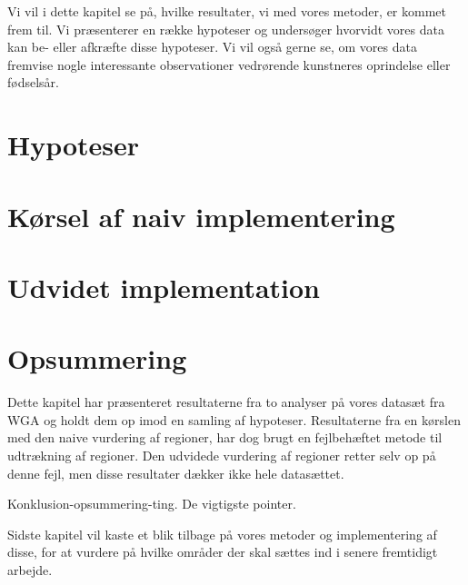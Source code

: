 {
{\sffamily Vi vil i dette kapitel se på, hvilke resultater, vi med vores
metoder, er kommet frem til. Vi præsenterer en række hypoteser og
undersøger hvorvidt vores data kan be- eller afkræfte disse hypoteser.
Vi vil også gerne se, om vores data fremvise nogle interessante
observationer vedrørende kunstneres oprindelse eller fødselsår.
}

\section{Hypoteser}


\section{Kørsel af naiv implementering\label{section_naiv_koersel}}

\clearpage



\section{Udvidet implementation\label{section_udvidet_koersel}}


\section*{Opsummering}
Dette kapitel har præsenteret resultaterne fra to analyser på vores
datasæt fra WGA og holdt dem op imod en samling af hypoteser.
Resultaterne fra en kørslen med den naive vurdering af regioner, har dog
brugt en fejlbehæftet metode til udtrækning af regioner.  Den udvidede
vurdering af regioner retter selv op på denne fejl, men disse resultater
dækker ikke hele datasættet.

Konklusion-opsummering-ting. De vigtigste pointer.

Sidste kapitel vil kaste et blik tilbage på vores metoder og
implementering af disse, for at vurdere på hvilke områder der skal
sættes ind i senere fremtidigt arbejde.

}
